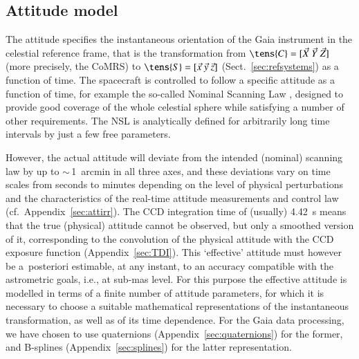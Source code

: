 \documentclass[structabstract]{aa}
\begin{document}
\subsection{Attitude model }\label{sec:attmodel}

The attitude specifies the instantaneous orientation of the Gaia
instrument in the celestial reference frame, that is the transformation 
from $\tens{C}=[\vec{X}~\vec{Y}~\vec{Z}]$ (more precisely, the
CoMRS) to $\tens{S}=[\vec{x}~\vec{y}~\vec{z}]$ (Sect.~\ref{sec:refsystems})
as a function of time. The spacecraft is controlled to follow a specific
attitude as a function of time, for example the so-called Nominal Scanning Law 
\citep[NSL;][]{2010IAUS..261..331D}, designed to provide good coverage of the
whole celestial sphere while satisfying a number of other requirements. The
NSL is analytically defined for arbitrarily long time intervals by just a few 
free parameters.

However, the actual attitude will deviate from the intended (nominal) scanning
law by up to $\sim\,$1~arcmin in all three axes, and these deviations vary on
time scales from seconds to minutes depending on the level of physical
perturbations and the characteristics of the real-time attitude measurements
and control law (cf.\ Appendix~\ref{sec:attirr}). The CCD integration time of
(usually) 4.42~s means that the true (physical) attitude cannot be observed,
but only a smoothed version of it, corresponding to the convolution of the
physical attitude with the CCD exposure function (Appendix~\ref{sec:TDI}).
This `effective' attitude must however
be a~posteriori estimable, at any instant, 
to an accuracy compatible with the astrometric goals, i.e., at sub-mas level.
For this purpose the effective attitude is modelled in
terms of a finite number of attitude parameters, for which it is necessary to
choose a suitable mathematical representations of the instantaneous
transformation, as well as of its time dependence. For the Gaia data
processing, we have chosen to use quaternions 
(Appendix~\ref{sec:quaternions}) for the former, and B-splines 
(Appendix~\ref{sec:splines}) for the latter representation.
\end{document}
